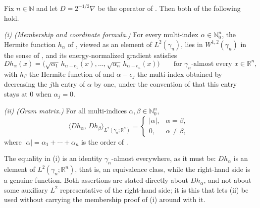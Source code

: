 \begin{lemma}
Fix $n \in \mathbb{N}$ and let $D = 2^{-1/2}\nabla$ be the operator of
.  Then both of the following hold.

\emph{(i) (Membership and coordinate formula.)}  For every multi-index
$\alpha \in \mathbb{N}_0^n$, the Hermite function $h_\alpha$ of
, viewed as an element of $L^2(\gamma_n)$, lies in
$W^{1,2}(\gamma_n)$ in the sense of , and its energy-normalized
gradient satisfies
\[
  D h_\alpha(x)
    = \bigl(\sqrt{\alpha_1}\,h_{\alpha-e_1}(x), \ldots,
            \sqrt{\alpha_n}\,h_{\alpha-e_n}(x)\bigr)
  \qquad \text{for $\gamma_n$-almost every } x \in \mathbb{R}^n,
\]
with $h_\beta$ the Hermite function of  and $\alpha - e_j$ the
multi-index obtained by decreasing the $j$th entry of $\alpha$ by one, under the
convention of  that this entry stays at $0$ when
$\alpha_j = 0$.

\emph{(ii) (Gram matrix.)}  For all multi-indices
$\alpha, \beta \in \mathbb{N}_0^n$,
\[
  \langle D h_\alpha,\, D h_\beta\rangle_{L^2(\gamma_n;\mathbb{R}^n)}
    = \begin{cases}
        |\alpha|, & \alpha = \beta,\\
        0, & \alpha \neq \beta,
      \end{cases}
\]
where $|\alpha| = \alpha_1 + \cdots + \alpha_n$ is the order of
.

The equality in (i) is an identity $\gamma_n$-almost everywhere, as it must be:
$D h_\alpha$ is an element of $L^2(\gamma_n;\mathbb{R}^n)$, that is, an
equivalence class, while the right-hand side is a genuine function.  Both
assertions are stated directly about $D h_\alpha$, and not about some auxiliary
$L^2$ representative of the right-hand side; it is this that lets (ii) be used
without carrying the membership proof of (i) around with it.
\end{lemma}
